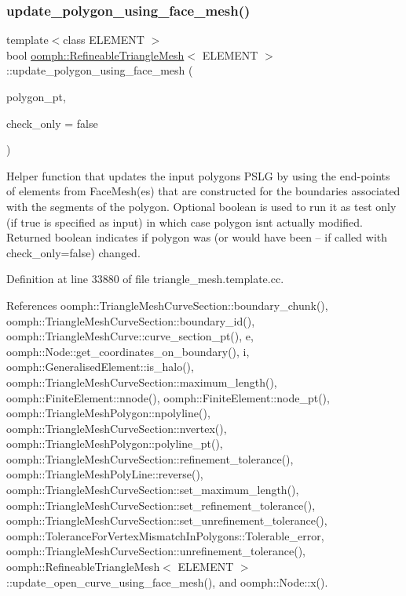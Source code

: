 \subsubsection{\texorpdfstring{update\+\_\+polygon\+\_\+using\+\_\+face\+\_\+mesh()}{update\_polygon\_using\_face\_mesh()}}
{\footnotesize\ttfamily template$<$class E\+L\+E\+M\+E\+NT $>$ \\
bool \hyperlink{classoomph_1_1RefineableTriangleMesh}{oomph\+::\+Refineable\+Triangle\+Mesh}$<$ E\+L\+E\+M\+E\+NT $>$\+::update\+\_\+polygon\+\_\+using\+\_\+face\+\_\+mesh (\begin{DoxyParamCaption}\item[{\hyperlink{classoomph_1_1TriangleMeshPolygon}{Triangle\+Mesh\+Polygon} $\ast$}]{polygon\+\_\+pt,  }\item[{const bool \&}]{check\+\_\+only = {\ttfamily false} }\end{DoxyParamCaption})\hspace{0.3cm}{\ttfamily [protected]}}



Helper function that updates the input polygon\textquotesingle{}s P\+S\+LG by using the end-\/points of elements from Face\+Mesh(es) that are constructed for the boundaries associated with the segments of the polygon. Optional boolean is used to run it as test only (if true is specified as input) in which case polygon isn\textquotesingle{}t actually modified. Returned boolean indicates if polygon was (or would have been -- if called with check\+\_\+only=false) changed. 



Definition at line 33880 of file triangle\+\_\+mesh.\+template.\+cc.



References oomph\+::\+Triangle\+Mesh\+Curve\+Section\+::boundary\+\_\+chunk(), oomph\+::\+Triangle\+Mesh\+Curve\+Section\+::boundary\+\_\+id(), oomph\+::\+Triangle\+Mesh\+Curve\+::curve\+\_\+section\+\_\+pt(), e, oomph\+::\+Node\+::get\+\_\+coordinates\+\_\+on\+\_\+boundary(), i, oomph\+::\+Generalised\+Element\+::is\+\_\+halo(), oomph\+::\+Triangle\+Mesh\+Curve\+Section\+::maximum\+\_\+length(), oomph\+::\+Finite\+Element\+::nnode(), oomph\+::\+Finite\+Element\+::node\+\_\+pt(), oomph\+::\+Triangle\+Mesh\+Polygon\+::npolyline(), oomph\+::\+Triangle\+Mesh\+Curve\+Section\+::nvertex(), oomph\+::\+Triangle\+Mesh\+Polygon\+::polyline\+\_\+pt(), oomph\+::\+Triangle\+Mesh\+Curve\+Section\+::refinement\+\_\+tolerance(), oomph\+::\+Triangle\+Mesh\+Poly\+Line\+::reverse(), oomph\+::\+Triangle\+Mesh\+Curve\+Section\+::set\+\_\+maximum\+\_\+length(), oomph\+::\+Triangle\+Mesh\+Curve\+Section\+::set\+\_\+refinement\+\_\+tolerance(), oomph\+::\+Triangle\+Mesh\+Curve\+Section\+::set\+\_\+unrefinement\+\_\+tolerance(), oomph\+::\+Tolerance\+For\+Vertex\+Mismatch\+In\+Polygons\+::\+Tolerable\+\_\+error, oomph\+::\+Triangle\+Mesh\+Curve\+Section\+::unrefinement\+\_\+tolerance(), oomph\+::\+Refineable\+Triangle\+Mesh$<$ E\+L\+E\+M\+E\+N\+T $>$\+::update\+\_\+open\+\_\+curve\+\_\+using\+\_\+face\+\_\+mesh(), and oomph\+::\+Node\+::x().



